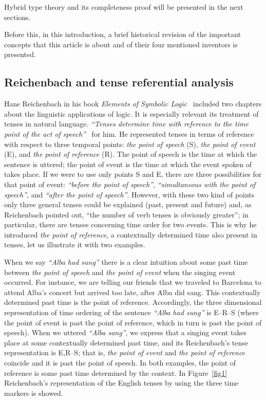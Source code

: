 Hybrid type theory and its completeness proof will be presented in the next
sections.

Before this, in this introduction, a brief historical revision of the
important concepts that this article is about and of their four mentioned
inventors is presented.

\subsection{Reichenbach and tense referential analysis}

Hans Reichenbach in his book \emph{Elements of Symbolic 
Logic}~\cite{Reichenbach1947} included two chapters about the linguistic applications
of logic. It is especially relevant its treatment of tenses in natural
language. \emph{``Tenses determine time with reference to
the time point of the act of 
speech''}~\cite{Reichenbach1947} for him. He represented tenses in terms of reference with respect to
three temporal points: \emph{the point of speech} (S), \emph{the point
of event} (E), and \emph{the point of reference} (R). The point of speech
is the time at which the sentence is uttered; the point of event is the time
at which the event spoken of takes place. If we were to use only points S
and E, there are three possibilities for that point of event:
\emph{``before the point of speech''},
\emph{``simultaneous with the point of speech''}, 
and \emph{``after the point of speech''}. However, with these two kind of points only three
general tenses could be explained (past, present and future) and, as
Reichenbach pointed out, ``the number of verb tenses is
obviously greater''; in particular, there are tenses
concerning time order for two events. This is why he introduced \emph{the
point of reference}, a contextually determined time also present in tenses,
let us illustrate it with two examples.

When we say \emph{``Alba had sung''} there
is a clear intuition about some past time between 
\emph{the point of speech} and \emph{the point of event} when the singing event occurred. For
instance, we are telling our friends that we traveled to Barcelona to
attend Alba's concert but arrived too late, after Alba did sang. This
contextually determined past time is the point of reference. Accordingly,
the three dimensional representation of time ordering of the sentence 
\emph{``Alba had sung''} is E--R--S (where the
point of event is past the point of reference, which in turn is past the
point of speech). When we uttered \emph{``Alba
sang''}, we express that a singing event takes place at
some contextually determined past time, and its Reichenbach's tense
representation is E,R--S; that is, \emph{the point of event} and 
\emph{the point of reference} coincide and it is past the point of speech. In both
examples, the point of reference is some past time determined by the
context. In Figure~\ref{fig1} Reichenbach's representation of the English tenses by
using the three time markers is showed.

